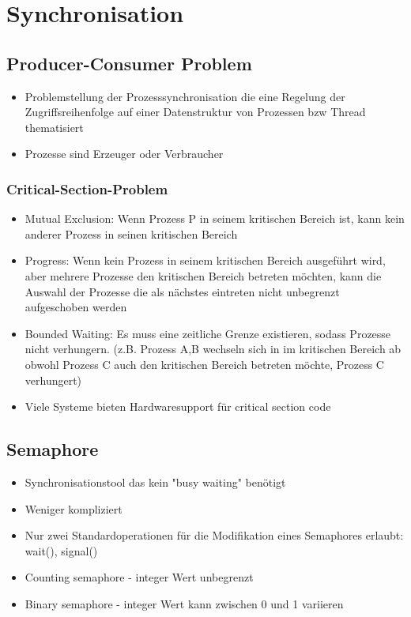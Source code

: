 \documentclass[a4paper]{scrreprt}
\begin{document}
\section{Synchronisation}
	\subsection {Producer-Consumer Problem}
		\begin{itemize}
			\item Problemstellung der Prozesssynchronisation die eine Regelung der Zugriffsreihenfolge auf einer Datenstruktur von Prozessen bzw Thread thematisiert
			\item Prozesse sind Erzeuger oder Verbraucher
		\end{itemize}	
	\subsubsection{Critical-Section-Problem}
		\begin{itemize}
			\item Mutual Exclusion: Wenn Prozess P in seinem kritischen Bereich ist, kann kein anderer Prozess in seinen kritischen Bereich
			\item Progress:  Wenn kein Prozess in seinem kritischen Bereich ausgeführt wird, aber mehrere Prozesse den kritischen Bereich betreten möchten, kann die Auswahl der Prozesse die als nächstes eintreten nicht unbegrenzt aufgeschoben werden
			\item Bounded Waiting: Es muss eine zeitliche Grenze existieren, sodass Prozesse nicht verhungern. (z.B. Prozess A,B wechseln sich in im kritischen Bereich ab obwohl Prozess C auch den kritischen Bereich betreten möchte, Prozess C verhungert)
			\item Viele Systeme bieten Hardwaresupport für critical section code
		\end{itemize}
	\subsection{Semaphore}
		\begin{itemize}
			\item Synchronisationstool das kein "busy waiting" benötigt
			\item Weniger kompliziert
			\item Nur zwei Standardoperationen für die Modifikation eines Semaphores erlaubt: wait(), signal()
			\item Counting semaphore - integer Wert unbegrenzt
			\item Binary semaphore - integer Wert kann zwischen 0 und 1 variieren 
		\end{itemize}
\end{document}
